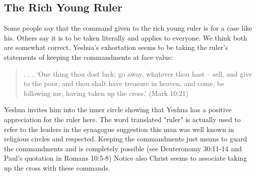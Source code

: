\documentclass[11pt]{article}
\begin{document}
\subsection{The Rich Young Ruler}
Some people say that the command given to the rich young ruler is for a case like his. Others say it is to be taken literally and applies to everyone. We think both are somewhat correct. Yeshua's exhortation seems to be taking the ruler's statements of keeping the commandments at face value:
\begin{quote}
. . . `One thing thou dost lack; go away, whatever thou hast -- sell, and give to the poor, and thou shalt have treasure in heaven, and come, be following me, having taken up the cross.' (Mark 10:21) 
\end{quote}
Yeshua invites him into the inner circle showing that Yeshua has a positive appreciation for the ruler here. The word translated "ruler" is actually used to refer to the leaders in the synagogue suggestion this man was well known in religious circles and respected. Keeping the commandments just means to guard the commandments \cite{keep meaning} and is completely possible (see Deuteronomy 30:11-14 and Paul's quotation in Romans 10:5-8) 
Notice also Christ seems to associate taking up the cross with these commands.
\end{document}
